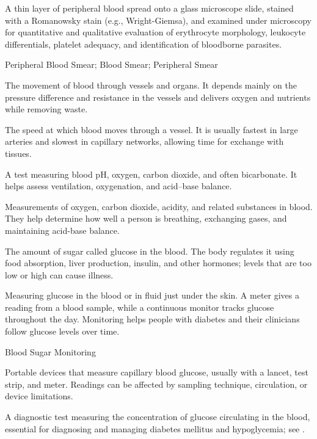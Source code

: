  A thin layer of peripheral blood spread onto a glass microscope slide, stained with a Romanowsky stain (e.g., Wright-Giemsa), and examined under microscopy for quantitative and qualitative evaluation of erythrocyte morphology, leukocyte differentials, platelet adequacy, and identification of bloodborne parasites.

\synonyms
Peripheral Blood Smear; Blood Smear; Peripheral Smear

 The movement of blood through vessels and organs. It depends mainly on the pressure difference and resistance in the vessels and delivers oxygen and nutrients while removing waste.

 The speed at which blood moves through a vessel. It is usually fastest in large arteries and slowest in capillary networks, allowing time for exchange with tissues.

 A test measuring blood pH, oxygen, carbon dioxide, and often bicarbonate. It helps assess ventilation, oxygenation, and acid–base balance.

 Measurements of oxygen, carbon dioxide, acidity, and related substances in blood. They help determine how well a person is breathing, exchanging gases, and maintaining acid-base balance.

 The amount of sugar called glucose in the blood. The body regulates it using food absorption, liver production, insulin, and other hormones; levels that are too low or high can cause illness.

 Measuring glucose in the blood or in
fluid just under the skin. A meter gives a reading from a blood sample, while
a continuous monitor tracks glucose throughout the day. Monitoring helps
people with diabetes and their clinicians follow glucose levels over time.

\synonyms
Blood Sugar Monitoring

 Portable devices that measure capillary blood glucose, usually with a lancet, test strip, and meter. Readings can be affected by sampling technique, circulation, or device limitations.

 A diagnostic test measuring the concentration of glucose circulating in the blood, essential for diagnosing and managing diabetes mellitus and hypoglycemia; see .

